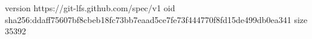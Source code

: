 version https://git-lfs.github.com/spec/v1
oid sha256:ddaff75607bf8cbeb18fc73bb7eaad5ce7fe73f444770f8fd15de499db0ea341
size 35392
